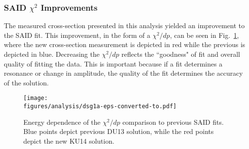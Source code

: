 
\FloatBarrier
\subsubsection{SAID $\chi^2$ Improvements}\label{sec:chi}
The measured cross-section presented in this analysis yielded an improvement to the SAID fit. This improvement, in the form of a $\chi^2/dp$, can be seen in Fig.~\ref{fig:chi_sq}, where the new cross-section measurement is depicted in red while the previous is depicted in blue. Decreasing the $\chi^2/dp$ reflects the ``goodness" of fit and overall quality of fitting the data. This is important because if a fit determines a resonance or change in amplitude, the quality of the fit determines the accuracy of the solution.  
\begin{figure}[h!]\begin{center}
\texttt{[image: \\figures/analysis/dsg1a-eps-converted-to.pdf]}
\caption[Energy dependence of the $\chi^2/dp$ comparison to previous SAID fits]{\label{fig:chi_sq}Energy dependence of the $\chi^2/dp$ comparison to previous SAID fits. Blue points depict previous DU13 solution, while the red points depict the new KU14 solution.}
\end{center}\end{figure} 
\FloatBarrier
%
%
